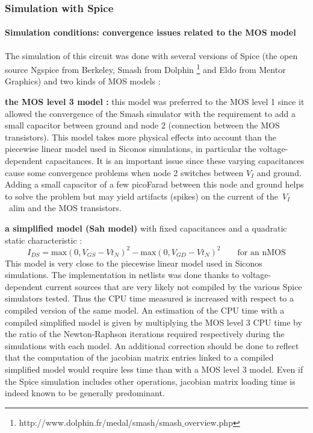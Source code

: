 \subsubsection{Simulation with {\sc Spice} }

\paragraph{Simulation conditions: convergence issues related to the MOS model}
The simulation of this circuit was done with several versions of {\sc Spice} (the open source {\sc Ngspice} from
Berkeley, {\sc Smash} from Dolphin \footnote{http://www.dolphin.fr/medal/smash/smash$\_$overview.php} and
{\sc Eldo} from Mentor Graphics) and two kinds of MOS models :
\begin{description}
\item \textbf{the MOS level 3 model :} this model was preferred to the MOS level 1 since it allowed the convergence
of the {\sc Smash} simulator with the requirement to add a small capacitor between ground and node 2 (connection between
the MOS transistors). This model takes more physical effects into account than the piecewise linear model used in {\sc Siconos} simulations,
in particular the voltage-dependent capacitances. It is an important issue since these varying capacitances
cause some convergence problems when node 2 switches between $V_I$ and ground.
Adding a small capacitor of a few picoFarad between this node and ground helps to solve the problem
but may yield artifacts (spikes) on the current of the~$V_I$~alim and the MOS transistors.
\item\textbf{a simplified model (Sah model)} with fixed capacitances and a quadratic static characteristic :
\[
I_{DS} = \textrm{max}(0,V_{GS}-Vt_N)^2 - \textrm{max}(0,V_{GD}-Vt_N)^2 \qquad \textrm{for an nMOS}
\]
This model is very close to the piecewise linear model used in {\sc Siconos} simulations. The implementation in netlists was done thanks to 
voltage-dependent current sources that are very likely not compiled by the various {\sc Spice} simulators tested.
Thus the CPU time measured is increased with respect to a compiled version of the same model.
An estimation of the CPU time with a compiled simplified model is given by multiplying the MOS level 3 CPU time
by the ratio of the Newton-Raphson iterations required respectively during the simulations with each model.
An additional correction should be done to reflect that the computation of the jacobian matrix entries
linked to a compiled simplified model would require less time than with a MOS level 3 model. Even if the {\sc Spice} simulation
includes other operations, jacobian matrix loading time is indeed known to be generally predominant.
\end{description}


